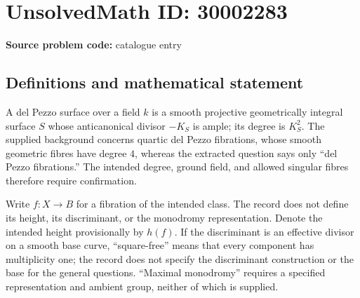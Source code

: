 \documentclass[11pt]{article}
\begin{document}
\section*{UnsolvedMath ID: 30002283}
\textbf{Source problem code:} catalogue entry
\subsection{Definitions and mathematical statement}
A del Pezzo surface over a field \(k\) is a smooth projective geometrically integral surface \(S\) whose anticanonical divisor \(-K_S\) is ample; its degree is \(K_S^2\). The supplied background concerns quartic del Pezzo fibrations, whose smooth geometric fibres have degree \(4\), whereas the extracted question says only ``del Pezzo fibrations.'' The intended degree, ground field, and allowed singular fibres therefore require confirmation.

Write \(f\colon X\to B\) for a fibration of the intended class. The record does not define its height, its discriminant, or the monodromy representation. Denote the intended height provisionally by \(h(f)\). If the discriminant is an effective divisor on a smooth base curve, ``square-free'' means that every component has multiplicity one; the record does not specify the discriminant construction or the base for the general questions. ``Maximal monodromy'' requires a specified representation and ambient group, neither of which is supplied.
\end{document}
